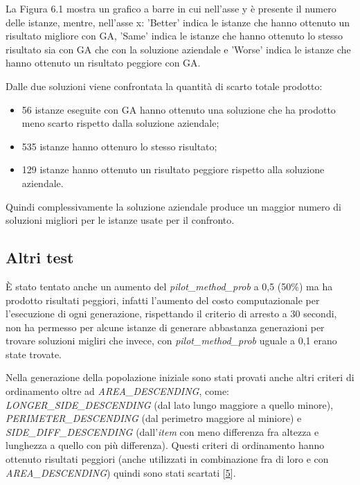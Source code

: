 La Figura 6.1 mostra un grafico a barre in cui nell'asse y è presente il numero delle istanze, mentre, nell'asse x: 'Better' indica le istanze che hanno ottenuto un risultato migliore con GA, 'Same' indica le istanze che hanno ottenuto lo stesso risultato sia con GA che con la soluzione aziendale e 'Worse' indica le istanze che hanno ottenuto un risultato peggiore con GA.

Dalle due soluzioni viene confrontata la quantità di scarto totale prodotto:
\begin{itemize}
    \item 56 istanze eseguite con GA hanno ottenuto una soluzione che ha prodotto meno scarto rispetto dalla soluzione aziendale;
    \item 535 istanze hanno ottenuro lo stesso risultato;
    \item 129 istanze hanno ottenuto un risultato peggiore rispetto alla soluzione aziendale.
\end{itemize}

Quindi complessivamente la soluzione aziendale produce un maggior numero di soluzioni migliori per le istanze usate per il confronto.

\subsection{Altri test} \hypertarget{chiara3}{}

È stato tentato anche un aumento del \emph{pilot\_method\_prob} a 0,5 (50\%) ma ha prodotto risultati peggiori, infatti l'aumento del costo computazionale per l'esecuzione di ogni generazione, rispettando il criterio di arresto a 30 secondi, non ha permesso per alcune istanze di generare abbastanza generazioni per trovare soluzioni migliri che invece, con \emph{pilot\_method\_prob} uguale a 0,1 erano state trovate.

Nella generazione della popolazione iniziale sono stati provati anche altri criteri di ordinamento oltre ad \emph{AREA\_DESCENDING}, come: \emph{LONGER\_SIDE\_DESCENDING} (dal lato lungo maggiore a quello minore), \emph{PERIMETER\_DESCENDING} (dal perimetro maggiore al miniore) e \emph{SIDE\_DIFF\_DESCENDING} (dall'\emph{item} con meno differenza fra altezza e lunghezza a quello con più differenza). Questi criteri di ordinamento hanno ottenuto risultati peggiori (anche utilizzati in combinazione fra di loro e con \emph{AREA\_DESCENDING}) quindi sono stati scartati [\hyperlink{bibliografia}{5}]. 